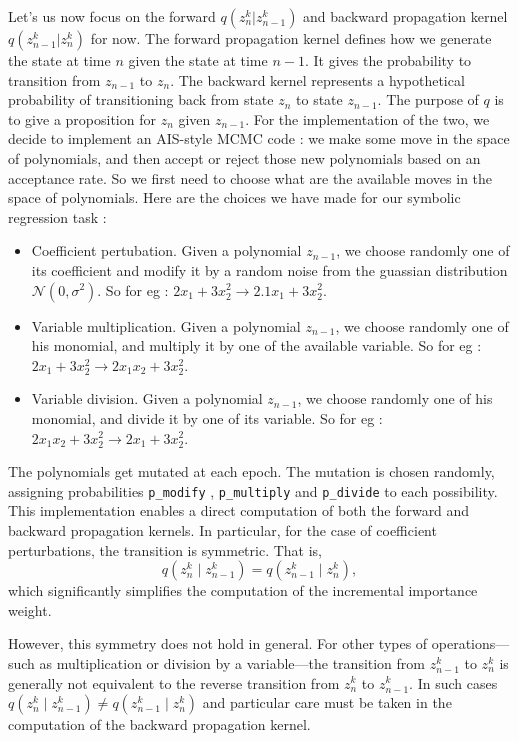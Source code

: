 \documentclass[11pt,a4paper]{article}
\begin{document}
		Let's us now focus on the forward $q(z_n^k | z_{n-1}^k)$ and backward propagation kernel $q(z_{n-1}^k | z_n^k)$ for now. The forward propagation kernel defines how we generate the state at time $n$ given the state at time $n-1$. It gives the probability to transition from $z_{n-1}$ to $z_n$. The backward kernel represents a hypothetical probability of transitioning back from state $z_n$ to state $z_{n-1}$. The purpose of $q$ is to give a proposition for $z_n$ given $z_{n-1}$. For the implementation of the two, we decide to implement an AIS-style MCMC code : we make some move in the space of polynomials, and then accept or reject those new polynomials based on an acceptance rate. So we first need to choose what are the available moves in the space of polynomials. Here are the choices we have made for our symbolic regression task : 
		\begin{itemize}
			\item Coefficient pertubation. Given a polynomial $z_{n-1}$, we choose randomly one of its coefficient and modify it by a random noise from the guassian distribution $\mathcal{N}(0,\sigma^2)$. So for eg : $2 x_1 + 3 x_2^2 \rightarrow  2.1 x_1 + 3 x_2^2$.
			\item Variable multiplication. Given a polynomial $z_{n-1}$, we choose randomly one of his monomial, and multiply it by one of the available variable. So for eg : $2 x_1 + 3 x_2^2 \rightarrow  2 x_1 x_2 + 3 x_2^2$.
			\item Variable division. Given a polynomial $z_{n-1}$, we choose randomly one of his monomial, and divide it by one of its variable. So for eg : $2 x_1 x_2 + 3 x_2^2 \rightarrow  2 x_1 + 3 x_2^2$. 
		\end{itemize}
		The polynomials get mutated at each epoch. The mutation is chosen randomly, assigning probabilities \texttt{p\_{modify}} , \texttt{p\_{multiply}} and \texttt{p\_{divide}} to each possibility. This implementation enables a direct computation of both the forward and backward propagation kernels. In particular, for the case of coefficient perturbations, the transition is symmetric. That is,
		\begin{equation}
			q(z_n^k \mid z_{n-1}^k) = q(z_{n-1}^k \mid z_n^k),
		\end{equation}
		which significantly simplifies the computation of the incremental importance weight.
		
		However, this symmetry does not hold in general. For other types of operations—such as multiplication or division by a variable—the transition from \( z_{n-1}^k \) to \( z_n^k \) is generally not equivalent to the reverse transition from \( z_n^k \) to \( z_{n-1}^k \). In such cases $q(z_n^k \mid z_{n-1}^k) \ne q(z_{n-1}^k \mid z_n^k)$ and particular care must be taken in the computation of the backward propagation kernel.
		
\end{document}
